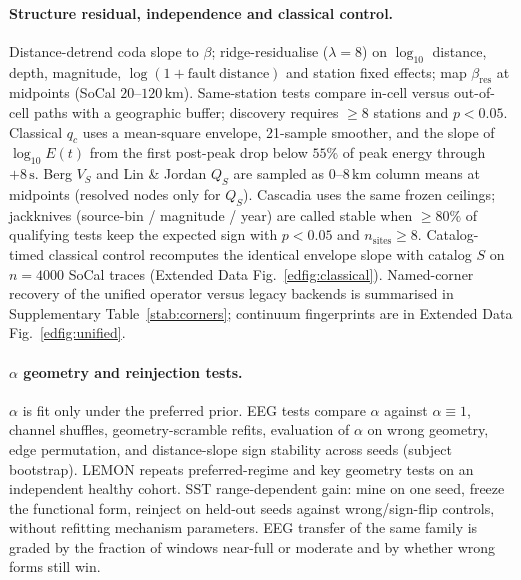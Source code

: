 \documentclass[twocolumn,10pt]{article}
\begin{document}
\paragraph{Structure residual, independence and classical control.}
Distance-detrend coda slope to \(\beta\); ridge-residualise
(\(\lambda=8\)) on \(\log_{10}\) distance, depth, magnitude,
\(\log(1+\mathrm{fault\ distance})\) and station fixed effects; map
\(\beta_{\mathrm{res}}\) at midpoints (SoCal \(20\)--\(120\,\mathrm{km}\)).
Same-station tests compare in-cell versus out-of-cell paths with a geographic
buffer; discovery requires \(\ge8\) stations and \(p<0.05\). Classical \(q_c\)
uses a mean-square envelope, 21-sample smoother, and the slope of
\(\log_{10}E(t)\) from the first post-peak drop below \(55\%\) of peak energy
through \(+8\,\mathrm{s}\). Berg \(V_S\) and Lin \& Jordan \(Q_S\) are sampled
as \(0\)--\(8\,\mathrm{km}\) column means at midpoints (resolved nodes only for
\(Q_S\)). Cascadia uses the same frozen ceilings; jackknives (source-bin /
magnitude / year) are called stable when \(\ge80\%\) of qualifying tests keep
the expected sign with \(p<0.05\) and \(n_{\mathrm{sites}}\ge8\). Catalog-timed
classical control recomputes the identical envelope slope with catalog \(S\) on
\(n=4000\) SoCal traces (Extended Data Fig.~\ref{edfig:classical}).
Named-corner recovery of the unified operator versus legacy backends is
summarised in Supplementary Table~\ref{stab:corners}; continuum fingerprints are
in Extended Data Fig.~\ref{edfig:unified}.

\paragraph{\(\alpha\) geometry and reinjection tests.}
\(\alpha\) is fit only under the preferred prior. EEG tests compare
\(\alpha\) against \(\alpha\equiv1\), channel shuffles, geometry-scramble
refits, evaluation of \(\alpha\) on wrong geometry, edge permutation, and
distance-slope sign stability across seeds (subject bootstrap). LEMON repeats
preferred-regime and key geometry tests on an independent healthy cohort. SST
range-dependent gain: mine on one seed, freeze the functional form, reinject on
held-out seeds against wrong/sign-flip controls, without refitting mechanism
parameters. EEG transfer of the same family is graded by the fraction of windows
near-full or moderate and by whether wrong forms still win.
\end{document}

